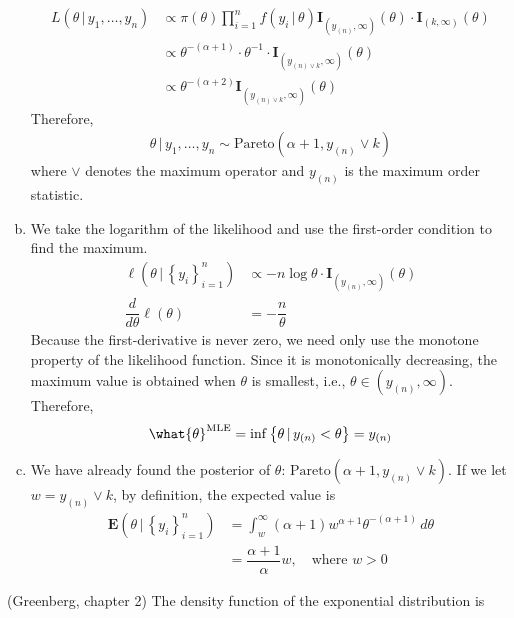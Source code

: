 \documentclass[answers]{exam}
\begin{document}
\begin{questions}
\begin{solution}
\begin{enumerate}[(a)]
      \begin{align}
        L\left(\theta\,|\,y_{1},\ldots,y_{n}\right) &\propto \pi\left(\theta\right)\prod_{i=1}^{n}f(y_{i}\,|\,\theta)\mathbf{I}_{(y_{(n)},\infty)}(\theta)\cdot\mathbf{I}_{(k,\infty)}(\theta)\\
        &\propto \theta^{-(\alpha+1)}\cdot \theta^{-1}\cdot \mathbf{I}_{(y_{(n)\vee k},\infty)}(\theta)\\
        &\propto \theta^{-(\alpha+2)}\mathbf{I}_{(y_{(n)\vee k},\infty)}(\theta)
      \end{align}
      Therefore,
      \begin{align}
        \theta\,|\,y_{1},\ldots,y_{n}\sim \mathrm{Pareto}(\alpha+1,y_{(n)}\vee k)
      \end{align}
      where $\vee$ denotes the maximum operator and $y_{(n)}$ is the maximum order statistic.
      \item We take the logarithm of the likelihood and use the first-order condition to find the maximum.
      \begin{align}
        \ell\left(\theta\,|\,\left\{y_{i}\right\}_{i=1}^{n}\right) &\propto -n\log\theta\cdot \mathbf{I}_{(y_{(n)},\infty)}(\theta)\\
        \dfrac{d}{d\theta}\ell(\theta)&= -\dfrac{n}{\theta}
      \end{align}
      Because the first-derivative is never zero, we need only use the monotone property of the likelihood function. Since it is monotonically decreasing, the maximum value is obtained when $\theta$ is smallest, i.e., $\theta\in(y_{(n)},\infty)$. Therefore,
      \begin{equation}
        \what{\theta}^{\text{MLE}} = \inf\left\{\theta\,|\, y_{(n)}<\theta \right\} = y_{(n)}
      \end{equation}
      \item We have already found the posterior of $\theta$: $\mathrm{Pareto}(\alpha+1,y_{(n)}\vee k)$. If we let $w=y_{(n)}\vee k$, by definition, the expected value is
      \begin{align}
        \mathbf{E}\left(\theta\,|\,\left\{y_{i}\right\}_{i=1}^{n}\right) &= \int_{w}^{\infty}(\alpha+1)w^{\alpha+1}\theta^{-(\alpha+1)}\,d\theta\\
        &= \dfrac{\alpha+1}{\alpha}w,\quad \text{where }w>0
      \end{align}
    \end{enumerate}
  \end{solution}
  \question
  (Greenberg, chapter 2) The density function of the exponential distribution is 

\end{questions}
\end{document}
